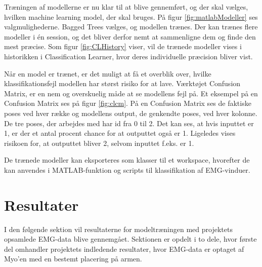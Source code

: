 
Træningen af modellerne er nu klar til at blive gennemført, og der skal vælges, hvilken machine learning model, der skal bruges. På figur \ref{fig:matlabModeller} ses valgmulighederne.
Bagged Trees vælges, og modellen trænes.
Der kan trænes flere modeller i én session, og det bliver derfor nemt at sammenligne dem og finde den mest præcise. Som figur \ref{fig:CLHistory} viser, vil de trænede modeller vises i historikken i Classification Learner, hvor deres individuelle præcision bliver vist.

Når en model er trænet, er det muligt at få et overblik over, hvilke klassifikationsfejl modellen har størst risiko for at lave. Værktøjet Confusion Matrix, er en nem og overskuelig måde at se modellens fejl på. Et eksempel på en Confusion Matrix ses på figur \ref{fig:clcm}. På en Confusion Matrix ses de faktiske poses ved hver række og modellens output, de genkendte poses, ved hver kolonne. De tre poses, der arbejdes med har id fra 0 til 2. Det kan ses, at hvis inputtet er 1, er der et antal procent chance for at outputtet også er 1. Ligeledes vises risikoen for, at outputtet bliver 2, selvom inputtet f.eks. er 1.


De trænede modeller kan eksporteres som klasser til et workspace, hvorefter de kan anvendes i MATLAB-funktion og scripts til klassifikation af EMG-vinduer.

\section{Resultater}	
I den følgende sektion vil resultaterne for modeltræningen med projektets opsamlede EMG-data blive gennemgået. Sektionen er opdelt i to dele, hvor første del omhandler projektets indledende resultater, hvor EMG-data er optaget af Myo'en med en bestemt placering på armen.

